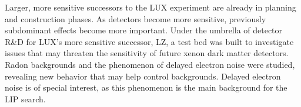 \noindent Larger, more sensitive successors to the LUX experiment are already in planning and construction phases. As detectors become more sensitive, previously subdominant effects become more important. Under the umbrella of detector R\&D for LUX's more sensitive successor, LZ, a test bed was built to investigate issues that may threaten the sensitivity of future xenon dark matter detectors. Radon backgrounds and the phenomenon of delayed electron noise were studied, revealing new behavior that may help control backgrounds. Delayed electron noise is of special interest, as this phenomenon is the main background for the LIP search.

\endgroup			

\vfill
